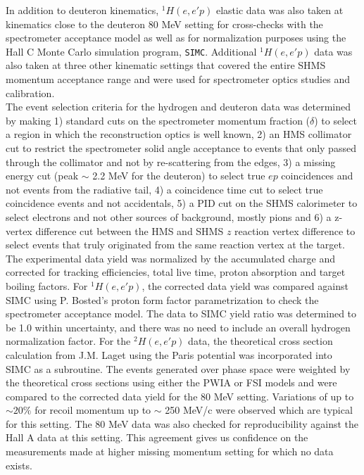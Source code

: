 \indent In addition to deuteron kinematics,  $^{1}H(e,e'p)$ elastic data was also taken at kinematics close to the deuteron 80 MeV setting for cross-checks with the spectrometer acceptance model as well as for normalization purposes using the  Hall C Monte Carlo
simulation program, \texttt{SIMC}. Additional $^{1}H(e,e'p)$ data was also taken at three other kinematic settings that covered the entire SHMS momentum acceptance range and were used for spectrometer optics studies and
calibration. \\
\indent The event selection criteria for the hydrogen and deuteron data was determined by making 1) standard cuts on the spectrometer momentum fraction ($\delta$) to select a region in which the reconstruction optics
is well known, 2) an HMS collimator cut to restrict the spectrometer solid angle acceptance to events that only passed through the collimator and not by re-scattering from the edges, 3) a missing
energy cut (peak $\sim$ 2.2 MeV for the deuteron) to select true $ep$ coincidences and not events from the radiative tail, 4) a coincidence time cut to select true coincidence events and not accidentals,  5) a PID cut on the
SHMS calorimeter to select electrons and not other sources of background, mostly pions and 6) a z-vertex difference cut between the HMS and SHMS $z$ reaction vertex difference to select events that truly
originated from the same reaction vertex at the target. \\
\indent The experimental data yield was normalized by the accumulated charge and corrected for tracking efficiencies, total live time, proton absorption and target boiling factors.
For $^{1}H(e,e'p)$, the corrected data yield was compared against SIMC using P. Bosted's proton form factor parametrization\cite{PhysRevC.51.409} to check the spectrometer acceptance
model. The data to SIMC yield ratio was determined to be 1.0 within uncertainty, and there was no need to include an overall hydrogen normalization factor. For the $^{2}H(e,e'p)$ data,
the theoretical cross section calculation from J.M. Laget using the Paris potential was incorporated into SIMC as a subroutine. The events generated
over phase space were weighted by the theoretical cross sections using either the PWIA or FSI models and were compared to the corrected data yield for the 80 MeV setting. Variations
of up to $\sim 20 \%$ for recoil momentum up to $\sim$ 250 MeV/c were observed which are typical for this setting. The 80 MeV data was also checked for reproducibility against the Hall A data
at this setting. This agreement gives us confidence on the measurements made at higher missing momentum setting for which no data exists. \\
